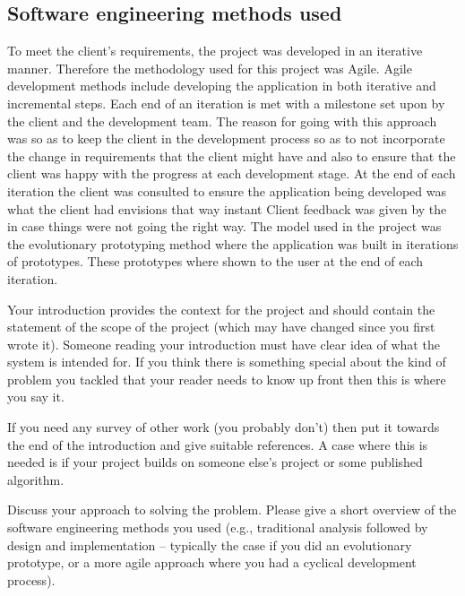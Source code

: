 \subsection*{Software engineering methods used}
To meet the client's requirements, the project was developed in an iterative manner. Therefore the methodology used for this project was Agile. Agile development methods include developing the application in both iterative and incremental steps. Each end of an iteration is met with a milestone set upon by the client and the development team. The reason for going with this approach  was so as to keep the client in the development process so as to not incorporate the change in requirements that the client might have and also to ensure that the client was happy with the progress at each development stage. At the end of each iteration the client was consulted to ensure the application being developed was what the client had envisions that way instant Client feedback was given by the in case things were not going the right way. The model used in the project was the evolutionary prototyping method where the application was built in iterations of prototypes. These prototypes where shown to the user at the end of each iteration.

\newpage
Your introduction provides the context for the project and should
contain the statement of the scope of the project (which may have
changed since you first wrote it). Someone reading your introduction
must have clear idea of what the system is intended for. If you think
there is something special about the kind of problem you tackled that
your reader needs to know up front then this is where you say it.

If you need any survey of other work (you probably don't) then put it
towards the end of the introduction and give suitable references. A
case where this is needed is if your project builds on someone else's
project or some published algorithm.

Discuss your approach to solving the problem. Please give a short
overview of the software engineering methods you used (e.g.,
traditional analysis followed by design and implementation -- typically
the case if you did an evolutionary prototype, or a more agile
approach where you had a cyclical development process). 

